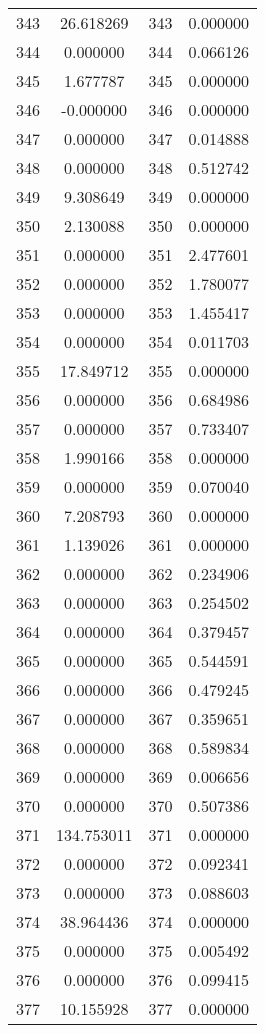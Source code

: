 \documentclass[12pt]{article}
\begin{document}
\begin{longtable}{@{}cccc@{}}
343 & 26.618269 & 343 & 0.000000 \\
344 & 0.000000 & 344 & 0.066126 \\
345 & 1.677787 & 345 & 0.000000 \\
346 & -0.000000 & 346 & 0.000000 \\
347 & 0.000000 & 347 & 0.014888 \\
348 & 0.000000 & 348 & 0.512742 \\
349 & 9.308649 & 349 & 0.000000 \\
350 & 2.130088 & 350 & 0.000000 \\
351 & 0.000000 & 351 & 2.477601 \\
352 & 0.000000 & 352 & 1.780077 \\
353 & 0.000000 & 353 & 1.455417 \\
354 & 0.000000 & 354 & 0.011703 \\
355 & 17.849712 & 355 & 0.000000 \\
356 & 0.000000 & 356 & 0.684986 \\
357 & 0.000000 & 357 & 0.733407 \\
358 & 1.990166 & 358 & 0.000000 \\
359 & 0.000000 & 359 & 0.070040 \\
360 & 7.208793 & 360 & 0.000000 \\
361 & 1.139026 & 361 & 0.000000 \\
362 & 0.000000 & 362 & 0.234906 \\
363 & 0.000000 & 363 & 0.254502 \\
364 & 0.000000 & 364 & 0.379457 \\
365 & 0.000000 & 365 & 0.544591 \\
366 & 0.000000 & 366 & 0.479245 \\
367 & 0.000000 & 367 & 0.359651 \\
368 & 0.000000 & 368 & 0.589834 \\
369 & 0.000000 & 369 & 0.006656 \\
370 & 0.000000 & 370 & 0.507386 \\
371 & 134.753011 & 371 & 0.000000 \\
372 & 0.000000 & 372 & 0.092341 \\
373 & 0.000000 & 373 & 0.088603 \\
374 & 38.964436 & 374 & 0.000000 \\
375 & 0.000000 & 375 & 0.005492 \\
376 & 0.000000 & 376 & 0.099415 \\
377 & 10.155928 & 377 & 0.000000 \\

\end{longtable}
\end{document}
